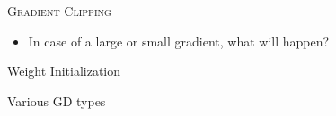 \begin{frame}{\scshape Gradient Clipping}
    \begin{itemize}
        \item In case of a large or small gradient, what will happen?
    \end{itemize}
\end{frame}

\begin{frame}{Weight Initialization}
    
\end{frame}

\begin{frame}{Various GD types}
    
\end{frame}